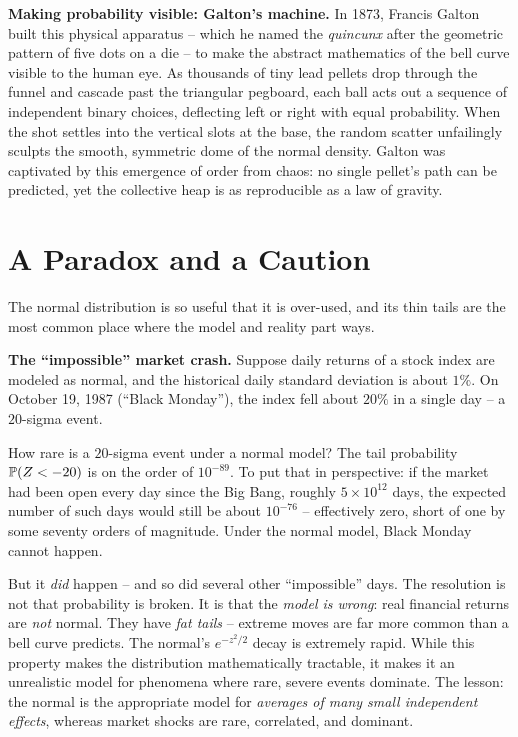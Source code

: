 \begin{connectionbox}
\textbf{Making probability visible: Galton's machine.}
In 1873, Francis Galton built this physical apparatus -- which he named the
\emph{quincunx} after the geometric pattern of five dots on a die -- to make the
abstract mathematics of the bell curve visible to the human eye. As thousands of
tiny lead pellets drop through the funnel and cascade past the triangular
pegboard, each ball acts out a sequence of independent binary choices, deflecting
left or right with equal probability. When the shot settles into the vertical
slots at the base, the random scatter unfailingly sculpts the smooth, symmetric
dome of the normal density. Galton was captivated by this emergence of order from
chaos: no single pellet's path can be predicted, yet the collective heap is as
reproducible as a law of gravity.
\end{connectionbox}

\section{A Paradox and a Caution}
\label{ch12:paradox}

The normal distribution is so useful that it is over-used, and its thin tails are
the most common place where the model and reality part ways.

\begin{paradoxbox}
\textbf{The ``impossible'' market crash.} Suppose daily returns of a stock index
are modeled as normal, and the historical daily standard deviation is about $1\%$.
On October 19, 1987 (``Black Monday''), the index fell about $20\%$ in a single
day -- a $20$-sigma event.

How rare is a $20$-sigma event under a normal model? The tail probability
$\P(Z < -20)$ is on the order of $10^{-89}$. To put that in perspective: if the
market had been open every day since the Big Bang, roughly $5\times 10^{12}$ days,
the expected number of such days would still be about $10^{-76}$ -- effectively
zero, short of one by some seventy orders of magnitude. Under the normal model,
Black Monday cannot happen.

But it \emph{did} happen -- and so did several other ``impossible'' days. The
resolution is not that probability is broken. It is that the \emph{model is
wrong}: real financial returns are \emph{not} normal. They have \emph{fat tails}
-- extreme moves are far more common than a bell curve predicts. The normal's
$e^{-z^2/2}$ decay is extremely rapid. While this property makes the distribution
mathematically tractable, it makes it an unrealistic model for phenomena where rare,
severe events dominate. The lesson: the normal is the appropriate model for
\emph{averages of many small independent effects}, whereas market shocks are
rare, correlated, and dominant.
\end{paradoxbox}

